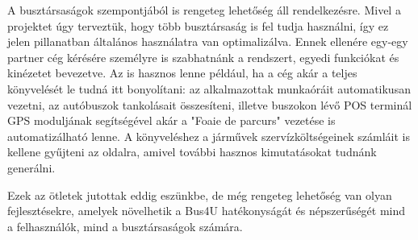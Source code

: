 A busztársaságok szempontjából is rengeteg lehetőség áll rendelkezésre. Mivel a projektet úgy terveztük, hogy több busztársaság is fel tudja használni, így ez jelen pillanatban általános használatra van optimalizálva. Ennek ellenére egy-egy partner cég kérésére személyre is szabhatnánk a rendszert, egyedi funkciókat és kinézetet bevezetve. Az is hasznos lenne például, ha a cég akár a teljes könyvelését le tudná itt bonyolítani: az alkalmazottak munkaóráit automatikusan vezetni, az autóbuszok tankolásait összesíteni, illetve buszokon lévő POS terminál GPS moduljának segítségével akár a "Foaie de parcurs" vezetése is automatizálható lenne. A könyveléshez a járművek szervízköltségeinek számláit is kellene gyűjteni az oldalra, amivel további hasznos kimutatásokat tudnánk generálni.

Ezek az ötletek jutottak eddig eszünkbe, de még rengeteg lehetőség van olyan fejlesztésekre, amelyek növelhetik a Bus4U hatékonyságát és népszerűségét mind a felhasználók, mind a busztársaságok számára.